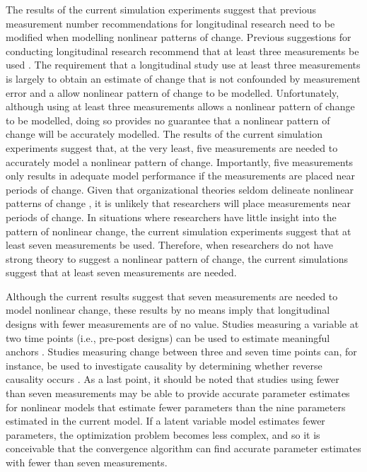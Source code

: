 \documentclass[
12pt, %
twoside,
english]{guelphthesis}
\begin{document}
The results of the current simulation experiments suggest that previous measurement number recommendations for longitudinal research need to be modified when modelling nonlinear patterns of change. Previous suggestions for conducting longitudinal research recommend that at least three measurements be used \autocite{chan1998,ployhart2010}. The requirement that a longitudinal study use at least three measurements is largely to obtain an estimate of change that is not confounded by measurement error \autocite{rogosa1982} and a allow nonlinear pattern of change to be modelled. Unfortunately, although using at least three measurements allows a nonlinear pattern of change to be modelled, doing so provides no guarantee that a nonlinear pattern of change will be accurately modelled. The results of the current simulation experiments suggest that, at the very least, five measurements are needed to accurately model a nonlinear pattern of change. Importantly, five measurements only results in adequate model performance if the measurements are placed near periods of change. Given that organizational theories seldom delineate nonlinear patterns of change \autocite[for a rare example, see][]{methot2017}, it is unlikely that researchers will place measurements near periods of change. In situations where researchers have little insight into the pattern of nonlinear change, the current simulation experiments suggest that at least seven measurements be used. Therefore, when researchers do not have strong theory to suggest a nonlinear pattern of change, the current simulations suggest that at least seven measurements are needed.

Although the current results suggest that seven measurements are needed to model nonlinear change, these results by no means imply that longitudinal designs with fewer measurements are of no value. Studies measuring a variable at two time points (i.e., pre-post designs) can be used to estimate meaningful anchors \autocite{anvari2021}. Studies measuring change between three and seven time points can, for instance, be used to investigate causality by determining whether reverse causality occurs \autocite{leszczensky2019}. As a last point, it should be noted that studies using fewer than seven measurements may be able to provide accurate parameter estimates for nonlinear models that estimate fewer parameters than the nine parameters estimated in the current model. If a latent variable model estimates fewer parameters, the optimization problem becomes less complex, and so it is conceivable that the convergence algorithm can find accurate parameter estimates with fewer than seven measurements.
\end{document}
